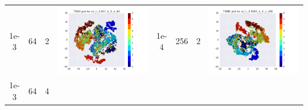 \documentclass[12pt]{report}
\begin{document}
\begin{table}[H]
\begin{tabular}{ | c | c | c | c || c | c | c| c |}
\begin{minipage}{.3\textwidth}
    \end{minipage}
    \\ \hline
    1e-3 & 64 & 2 &
    \begin{minipage}{.3\textwidth}
      \includegraphics[scale=0.25]{cd_lr_0_001_k_2_n_64.png}
    \end{minipage}
	&
    1e-4 & 256 & 2 &
    \begin{minipage}{.3\textwidth}
      \includegraphics[scale=0.25]{cd_lr_0_0001_k_2_n_256.png}
    \end{minipage}
    \\ \hline
     1e-3 & 64 & 4 &
    \begin{minipage}{.3\textwidth}

\end{minipage}
\end{tabular}
\end{table}
\end{document}
